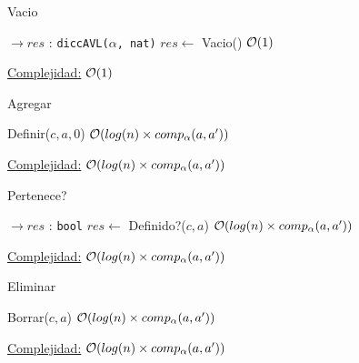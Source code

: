 \begin{Algoritmos}

\begin{algorithm}
\caption{Vacio}
\begin{algorithmic}[1]
$\to res$ : \texttt{diccAVL($\alpha$, nat)}
	\State $res \gets$ Vacio()
	\Comment $\mathcal{O}(1)$
\EndProcedure
\end{algorithmic}
\underline{Complejidad:} $\mathcal{O}(1)$
\end{algorithm}

\begin{algorithm}
\caption{Agregar}
\begin{algorithmic}[1]
	\State Definir($c, a, 0$)
	\Comment $\mathcal{O}(log(n) \times comp_{\alpha}(a, a'))$
\EndProcedure
\end{algorithmic}
\underline{Complejidad:} $\mathcal{O}(log(n) \times comp_{\alpha}(a, a'))$
\end{algorithm}

\begin{algorithm}
\caption{Pertenece?}
\begin{algorithmic}[1]
$\to res$ : \texttt{bool}
	\State $res \gets$ Definido?($c, a$)
	\Comment $\mathcal{O}(log(n) \times comp_{\alpha}(a, a'))$
\EndProcedure
\end{algorithmic}
\underline{Complejidad:} $\mathcal{O}(log(n) \times comp_{\alpha}(a, a'))$
\end{algorithm}

\begin{algorithm}
\caption{Eliminar}
\begin{algorithmic}[1]
	\State Borrar($c, a$)
	\Comment $\mathcal{O}(log(n) \times comp_{\alpha}(a, a'))$
\EndProcedure
\end{algorithmic}
\underline{Complejidad:} $\mathcal{O}(log(n) \times comp_{\alpha}(a, a'))$
\end{algorithm}
\end{Algoritmos}